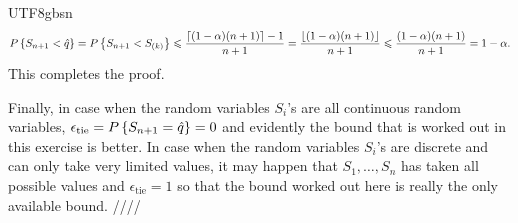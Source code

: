 \documentclass[../main.tex]{subfiles}
\begin{document}
\begin{CJK*}{UTF8}{gbsn}
\begin{equation*}
    P \left \{ S_{n+1} < \hat{q} \right \} 
    = P \left \{ S_{n+1} < S_{(k)} \right \} 
    \leqslant \frac{\lceil (1-\alpha)(n+1) \rceil - 1}{n+1}
    = \frac{\lfloor (1-\alpha)(n+1) \rfloor}{n+1} 
    \leqslant \frac{ (1-\alpha)(n+1) }{n+1} = 1-\alpha.
\end{equation*}
This completes the proof.

Finally, in case when the random variables $S_i$'s 
are all continuous random variables, 
$\epsilon_{\text{tie}} = P \left \{ S_{n+1} = \hat{q} \right \} = 0$ and 
evidently the bound that is worked out 
in this exercise is better.
In case when the random variables $S_i$'s 
are discrete and can only take very limited values,
it may happen that $S_1, \ldots, S_n$ has taken all 
possible values and $\epsilon_{\text{tie}} = 1$
so that the bound worked out here is really 
the only available bound.
////
\end{CJK*}
\end{document}
